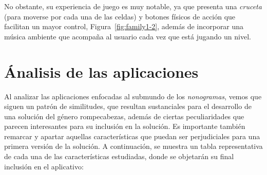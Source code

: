 No obstante, su experiencia de juego es muy notable, ya que presenta una \textit{cruceta} (para moverse por cada una de las celdas) 
y botones físicos de acción que facilitan un mayor control,
Figura~\ref{fig:family1-2}, además de incorporar una música ambiente que acompaña al usuario cada vez que  está jugando un nivel.

\section{Ánalisis de las aplicaciones}

Al analizar las aplicaciones enfocadas al submundo de los \textit{nonogramas}, vemos que siguen un patrón de similitudes, que resultan sustanciales 
para el desarrollo de una solución del género rompecabezas, además de ciertas peculiaridades que parecen interesantes para su inclusión en la solución.
Es importante también remarcar y apartar aquellas características que puedan ser perjudiciales para una primera versión de la solución.
A continuación, se muestra un tabla representativa de cada una de las características estudiadas, donde se objetarán su final inclusión en el aplicativo:


